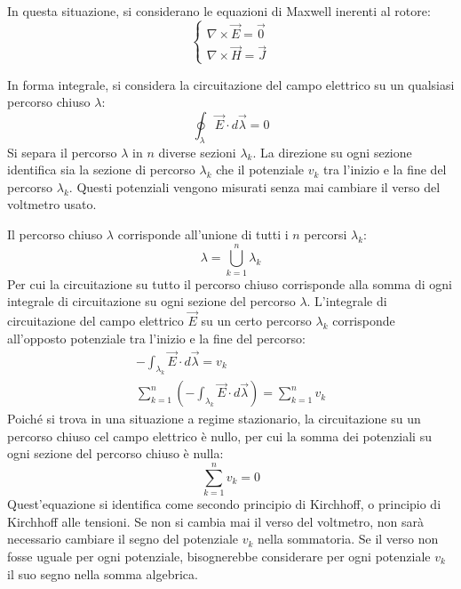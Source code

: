 \documentclass{article}
\numberwithin{equation}{subsection}
\begin{document}
In questa situazione, si considerano le equazioni di Maxwell inerenti al rotore:
\begin{equation*}
    \begin{cases}
        \nabla\times\vec{E}=\vec0\\
        \nabla\times\vec{H}=\vec{J}
    \end{cases}
\end{equation*}


In forma integrale, si considera la circuitazione del campo elettrico su un qualsiasi percorso chiuso $\lambda$:
\begin{equation*}
    \displaystyle\oint_{\lambda}\vec{E}\cdot d\vec{\lambda}=0
\end{equation*}
Si separa il percorso $\lambda$ in $n$ diverse sezioni $\lambda_k$. La direzione su ogni sezione identifica sia la sezione di percorso $\lambda_k$ che il potenziale $v_k$ tra 
l'inizio e la fine del percorso $\lambda_k$. Questi potenziali vengono misurati senza mai cambiare il verso del voltmetro usato. 

Il percorso chiuso $\lambda$ corrisponde all'unione di tutti i $n$ percorsi $\lambda_k$:
\begin{equation*}
    \lambda=\bigcup_{k=1}^n\lambda_k
\end{equation*}
Per cui la circuitazione su tutto il percorso chiuso corrisponde alla somma di ogni integrale di circuitazione su ogni sezione del percorso $\lambda$. L'integrale di circuitazione 
del campo elettrico $\vec{E}$ su un certo percorso $\lambda_k$ corrisponde all'opposto potenziale tra l'inizio e la fine del percorso:
\begin{gather*}
    -\int_{\lambda_k}\vec{E}\cdot d\vec{\lambda}=v_k\\
    \displaystyle\sum_{k=1}^n\left(-\int_{\lambda_k}\vec{E}\cdot d\vec{\lambda}\right)=\sum_{k=1}^nv_k
\end{gather*}
Poiché si trova in una situazione a regime stazionario, la circuitazione su un percorso chiuso cel campo elettrico è nullo, per cui la somma dei potenziali su ogni sezione 
del percorso chiuso è nulla:
\begin{equation}
    \displaystyle\sum_{k=1}^nv_k=0
\end{equation}
Quest'equazione si identifica come secondo principio di Kirchhoff, o principio di Kirchhoff alle tensioni. 
Se non si cambia mai il verso del voltmetro, non sarà necessario cambiare il segno del potenziale $v_k$ nella sommatoria. Se il verso non fosse uguale per ogni potenziale, 
bisognerebbe considerare per ogni potenziale $v_k$ il suo segno nella somma algebrica. 
\end{document}
